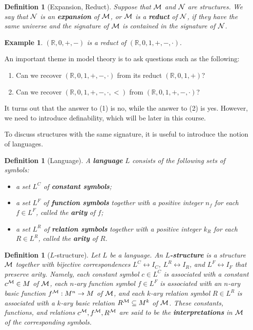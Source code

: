 \documentclass[10pt]{article}
\newcommand{\R}{\mathbb{R}}
\theoremstyle{newstyle}
\newtheorem{defn}[thm]{Definition}
\newtheorem{exmp}[thm]{Example}
\begin{document}
\begin{defn}[Expansion, Reduct] 
Suppose that ${\cal M}$ and ${\cal N}$ are structures. We say that ${\cal N}$ is an {\bf expansion} of 
${\cal M}$, or ${\cal M}$ is a {\bf reduct} of ${\cal N}$, if they have the same 
universe and the signature of ${\cal M}$ is contained in the signature of ${\cal N}$.
\end{defn}

\begin{exmp}
$(\R, 0, +, -)$ is a reduct of $(\R, 0, 1, +, -, \cdot)$.
\end{exmp}

An important theme in model theory is to ask questions such as the following:
\begin{enumerate}[(1)]
    \item Can we recover $(\R, 0, 1, +, -, \cdot)$ from its reduct $(\R, 0, 1, +)$?
    \item Can we recover $(\R, 0, 1, +, -, \cdot, <)$ from $(\R, 0, 1, +, -, \cdot)$?
\end{enumerate}
It turns out that the answer to (1) is no, while the answer to (2) is yes. 
However, we need to introduce definability, which will be later in this course. 

To discuss structures with the same signature, it is useful to introduce the notion of 
languages.

\begin{defn}[Language] 
A {\bf language} $L$ consists of the following sets of symbols:
\begin{itemize}
    \item a set $L^C$ of {\bf constant symbols};
    \item a set $L^F$ of {\bf function symbols} together with a positive integer 
    $n_f$ for each $f \in L^F$, called the {\bf arity} of $f$;
    \item a set $L^R$ of {\bf relation symbols} together with a positive integer 
    $k_R$ for each $R \in L^R$, called the {\bf arity} of $R$.
\end{itemize}
\end{defn}

\begin{defn}[$L$-structure] 
Let $L$ be a language. An {\bf $L$-structure} is a structure ${\cal M}$ together
with bijective correspondences $L^C \leftrightarrow I_C$, 
$L^R \leftrightarrow I_R$, and $L^F \leftrightarrow I_F$ that preserve arity. 
Namely, each constant symbol $c \in L^C$ is associated with a constant $c^{\cal M} \in M$ 
of ${\cal M}$, each $n$-ary function symbol $f \in L^F$ is associated with an 
$n$-ary basic function $f^{\cal M} : M^n \to M$ of ${\cal M}$, and 
each $k$-ary relation symbol $R \in L^R$ is associated with a $k$-ary basic 
relation $R^{\cal M} \subseteq M^k$ of ${\cal M}$. These constants, functions, and relations 
$c^{\cal M}, f^{\cal M}, R^{\cal M}$ are said to be the {\bf interpretations} in 
${\cal M}$ of the corresponding symbols.
\end{defn}
\end{document}
